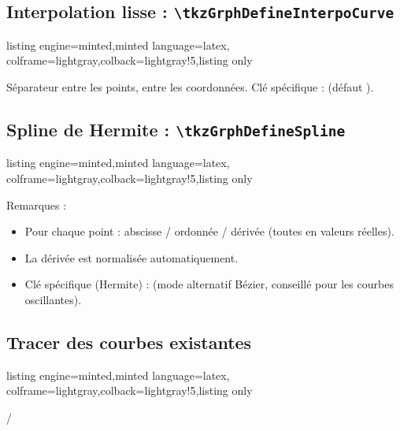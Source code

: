 \documentclass[11pt,a4paper]{ltxdoc}
\begin{document}
\subsection{Interpolation lisse : \texttt{\textbackslash tkzGrphDefineInterpoCurve}}

\begin{tcblisting}{listing engine=minted,minted language=latex,
  colframe=lightgray,colback=lightgray!5,listing only}
\end{tcblisting}

Séparateur  entre les points, \MontreCode{/} entre les coordonnées. Clé spécifique :  (défaut ).

\subsection{Spline de Hermite : \texttt{\textbackslash tkzGrphDefineSpline}}

\begin{tcblisting}{listing engine=minted,minted language=latex,
  colframe=lightgray,colback=lightgray!5,listing only}
\end{tcblisting}

Remarques :

\begin{itemize}
  \item Pour chaque point : abscisse / ordonnée / dérivée (toutes en valeurs réelles).
  \item La dérivée est normalisée automatiquement.
  \item Clé spécifique (Hermite) :  (mode alternatif Bézier, conseillé pour les courbes oscillantes).
\end{itemize}

\subsection{Tracer des courbes existantes}

\begin{tcblisting}{listing engine=minted,minted language=latex,
  colframe=lightgray,colback=lightgray!5,listing only}

\tkzGrphTracerCourbe / \tkzGrphTracerCourbes
\end{tcblisting}
\end{document}
